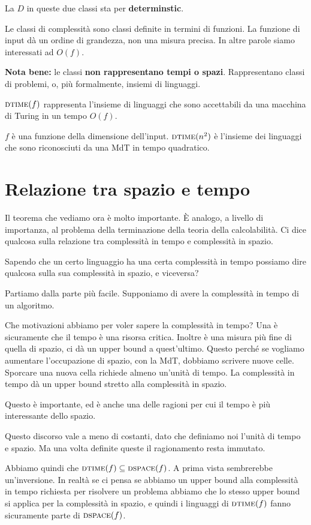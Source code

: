 La $D$ in queste due classi sta per \textbf{determinstic}.

Le classi di complessità sono classi definite in termini di funzioni. La funzione di input dà un
ordine di grandezza, non una misura precisa. In altre parole siamo interessati ad $O(f)$.

\textbf{Nota bene:} le classi \textbf{non rappresentano tempi o spazi}. Rappresentano classi di
problemi, o, più formalmente, insiemi di linguaggi.

$\textsc{dtime}(f)$ rappresenta l'insieme di linguaggi che sono accettabili da una macchina di Turing in un
tempo $O(f)$.

$f$ è una funzione della dimensione dell'input. $\textsc{dtime}(n^{2})$ è l'insieme dei linguaggi che sono
riconosciuti da una MdT in tempo quadratico.

\section{Relazione tra spazio e tempo}

Il teorema che vediamo ora è molto importante. È analogo, a livello di importanza, al problema
della terminazione della teoria della calcolabilità. Ci dice qualcosa sulla relazione tra
complessità in tempo e complessità in spazio.

Sapendo che un certo linguaggio ha una certa complessità in tempo possiamo dire qualcosa sulla sua
complessità in spazio, e viceversa?

Partiamo dalla parte più facile. Supponiamo di avere la complessità in tempo di un algoritmo.

Che motivazioni abbiamo per voler sapere la complessità in tempo? Una è sicuramente che il tempo è
una risorsa critica. Inoltre è una misura più fine di quella di spazio, ci dà un upper bound a
quest'ultimo. Questo perché se vogliamo aumentare l'occupazione di spazio, con la MdT, dobbiamo
scrivere nuove celle. Sporcare una nuova cella richiede almeno un'unità di tempo. La complessità in
tempo dà un upper bound stretto alla complessità in spazio.

Questo è importante, ed è anche una delle ragioni per cui il tempo è più interessante dello
spazio.

Questo discorso vale a meno di costanti, dato che definiamo noi l'unità di tempo e spazio. Ma una
volta definite queste il ragionamento resta immutato.

Abbiamo quindi che $\textsc{dtime}(f) \subseteq \textsc{dspace}(f)$. A prima vista sembrerebbe un'inversione. In
realtà se ci pensa se abbiamo un upper bound alla complessità in tempo richiesta per risolvere un
problema abbiamo che lo stesso upper bound si applica per la complessità in spazio, e quindi i
linguaggi di $\textsc{dtime}(f)$ fanno sicuramente parte di $\textsc{dspace}(f)$.

